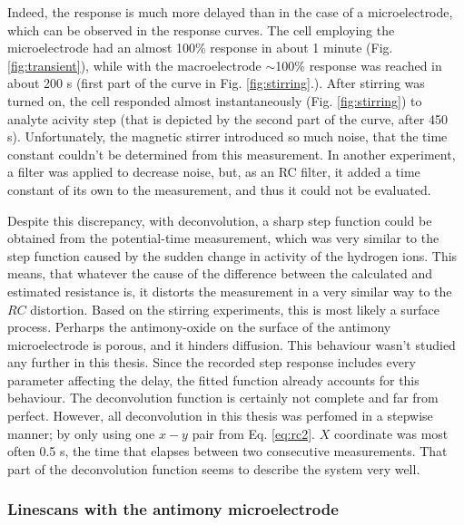 Indeed, the response is much more delayed than in the case of a microelectrode, which can be observed in the response curves.
The cell employing the microelectrode had an almost 100\% response in about 1 minute (Fig. \ref{fig:transient}), while with the macroelectrode $\sim$100\% response was reached in about 200 s (first part of the curve in Fig. \ref{fig:stirring}.).
After stirring was turned on, the cell responded almost instantaneously (Fig. \ref{fig:stirring}) to analyte acivity step (that is depicted by the second part of the curve, after 450 s).
Unfortunately, the magnetic stirrer introduced so much noise, that the time constant couldn't be determined from this measurement.
In another experiment, a filter was applied to decrease noise, but, as an RC filter, it added a time constant of its own to the measurement, and thus it could not be evaluated.

Despite this discrepancy, with deconvolution, a sharp step function could be obtained from the potential-time measurement, which was very similar to the step function caused by the sudden change in activity of the hydrogen ions.
This means, that whatever the cause of the difference between the calculated and estimated resistance is, it distorts the measurement in a very similar way to the $RC$ distortion. Based on the stirring experiments, this is most likely a surface process. Perharps the antimony-oxide on the surface of the antimony microelectrode is porous, and it hinders diffusion. This behaviour wasn't studied any further in this thesis. Since the recorded step response includes every parameter affecting the delay, the fitted function already accounts for this behaviour. The deconvolution function is certainly not complete and far from perfect. However, all deconvolution in this thesis was perfomed in a stepwise manner; by only using one $x-y$ pair from Eq. \ref{eq:rc2}. $X$ coordinate was most often 0.5 s, the time that elapses between two consecutive measurements. That part of the deconvolution function seems to describe the system very well.

			\subsubsection{Linescans with the antimony microelectrode}


